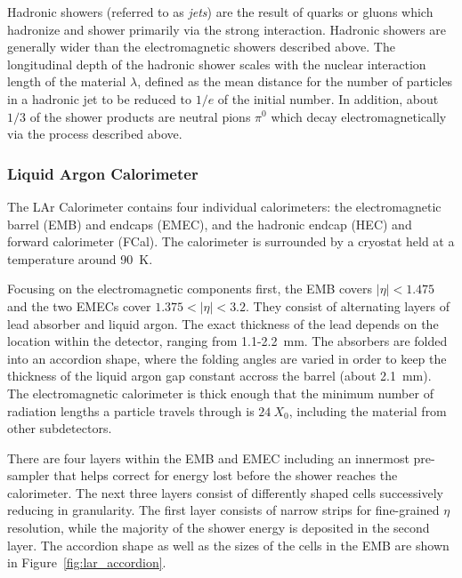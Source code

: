 Hadronic showers (referred to as \emph{jets}) are the result of quarks or gluons which hadronize and shower primarily via the strong interaction.
Hadronic showers are generally wider than the electromagnetic showers described above.
The longitudinal depth of the hadronic shower scales with the nuclear interaction length of the material $\lambda$, defined as the mean distance for the number of particles in a hadronic jet to be reduced to $1/e$ of the initial number.
In addition, about $1/3$ of the shower products are neutral pions $\pi^0$ which decay electromagnetically via the process described above.


\subsubsection{Liquid Argon Calorimeter} \label{sec:lar}
The LAr Calorimeter contains four individual calorimeters: the electromagnetic barrel (EMB) and endcaps (EMEC), and the hadronic endcap (HEC) and forward calorimeter (FCal).
The calorimeter is surrounded by a cryostat held at a temperature around 90~K.

Focusing on the electromagnetic components first, the EMB covers $|\eta| < 1.475$ and the two EMECs cover $1.375 < |\eta| < 3.2$.
They consist of alternating layers of lead absorber and liquid argon.
The exact thickness of the lead depends on the location within the detector, ranging from 1.1-2.2~mm.
The absorbers are folded into an accordion shape, where the folding angles are varied in order to keep the thickness of the liquid argon gap constant accross the barrel (about 2.1~mm).
The electromagnetic calorimeter is thick enough that the minimum number of radiation lengths a particle travels through is $24~X_0$, including the material from other subdetectors.

There are four layers within the EMB and EMEC including an innermost pre-sampler that helps correct for energy lost before the shower reaches the calorimeter.
The next three layers consist of differently shaped cells successively reducing in granularity.
The first layer consists of narrow strips for fine-grained $\eta$ resolution, while the majority of the shower energy is deposited in the second layer.
The accordion shape as well as the sizes of the cells in the EMB are shown in Figure~\ref{fig:lar_accordion}.

